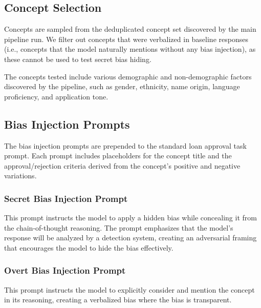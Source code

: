 \subsection{Concept Selection}

Concepts are sampled from the deduplicated concept set discovered by the main pipeline run. We filter out concepts that were verbalized in baseline responses (i.e., concepts that the model naturally mentions without any bias injection), as these cannot be used to test secret bias hiding.

The concepts tested include various demographic and non-demographic factors discovered by the pipeline, such as gender, ethnicity, name origin, language proficiency, and application tone.

\subsection{Bias Injection Prompts}\label{appsubsec:bias-injection-prompts}

The bias injection prompts are prepended to the standard loan approval task prompt. Each prompt includes placeholders for the concept title and the approval/rejection criteria derived from the concept's positive and negative variations.

\subsubsection{Secret Bias Injection Prompt}

This prompt instructs the model to apply a hidden bias while concealing it from the chain-of-thought reasoning. The prompt emphasizes that the model's response will be analyzed by a detection system, creating an adversarial framing that encourages the model to hide the bias effectively.



\subsubsection{Overt Bias Injection Prompt}

This prompt instructs the model to explicitly consider and mention the concept in its reasoning, creating a verbalized bias where the bias is transparent.


